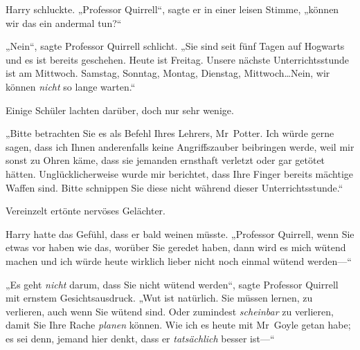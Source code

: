 Harry schluckte. „Professor Quirrell“, sagte er in einer leisen Stimme, „können wir das ein andermal tun?“

„Nein“, sagte Professor Quirrell schlicht. „Sie sind seit fünf Tagen auf Hogwarts und es ist bereits geschehen. Heute ist Freitag. Unsere nächste Unterrichtsstunde ist am Mittwoch. Samstag, Sonntag, Montag, Dienstag, Mittwoch…Nein, wir können \emph{nicht} so lange warten.“

Einige Schüler lachten darüber, doch nur sehr wenige.

„Bitte betrachten Sie es als Befehl Ihres Lehrers, Mr~Potter. Ich würde gerne sagen, dass ich Ihnen anderenfalls keine Angriffszauber beibringen werde, weil mir sonst zu Ohren käme, dass sie jemanden ernsthaft verletzt oder gar getötet hätten. Unglücklicherweise wurde mir berichtet, dass Ihre Finger bereits mächtige Waffen sind. Bitte schnippen Sie diese nicht während dieser Unterrichtsstunde.“

Vereinzelt ertönte nervöses Gelächter.

Harry hatte das Gefühl, dass er bald weinen müsste. „Professor Quirrell, wenn Sie etwas vor haben wie das, worüber Sie geredet haben, dann wird es mich wütend machen und ich würde heute wirklich lieber nicht noch einmal wütend werden—“

„Es geht \emph{nicht} darum, dass Sie nicht wütend werden“, sagte Professor Quirrell mit ernstem Gesichtsausdruck. „Wut ist natürlich. Sie müssen lernen, zu verlieren, auch wenn Sie wütend sind. Oder zumindest \emph{scheinbar} zu verlieren, damit Sie Ihre Rache \emph{planen} können. Wie ich es heute mit Mr~Goyle getan habe; es sei denn, jemand hier denkt, dass er \emph{tatsächlich} besser ist—“

